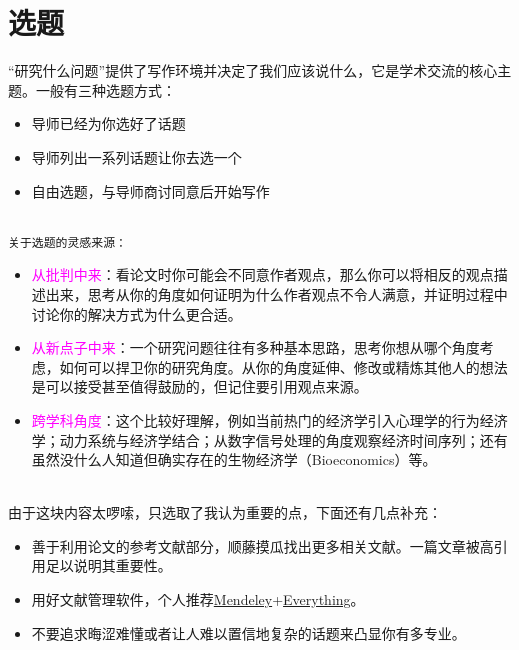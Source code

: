 \documentclass[cn,hazy,blue,14pt,screen]{elegantnote} %
\begin{document}
\newpage

\section{选题}

“研究什么问题”提供了写作环境并决定了我们应该说什么，它是学术交流的核心主题。一般有三种选题方式：

\begin{itemize}
  \item 导师已经为你选好了话题
  \item 导师列出一系列话题让你去选一个
  \item 自由选题，与导师商讨同意后开始写作
\end{itemize}

~\\

\lstinline{关于选题的灵感来源：}

\begin{itemize}
  \item \textcolor{magenta}{从批判中来}：看论文时你可能会不同意作者观点，那么你可以将相反的观点描述出来，思考从你的角度如何证明为什么作者观点不令人满意，并证明过程中讨论你的解决方式为什么更合适。
  \item \textcolor{magenta}{从新点子中来}：一个研究问题往往有多种基本思路，思考你想从哪个角度考虑，如何可以捍卫你的研究角度。从你的角度延伸、修改或精炼其他人的想法是可以接受甚至值得鼓励的，但记住要引用观点来源。
  \item \textcolor{magenta}{跨学科角度}：这个比较好理解，例如当前热门的经济学引入心理学的行为经济学；动力系统与经济学结合；从数字信号处理的角度观察经济时间序列；还有虽然没什么人知道但确实存在的生物经济学（Bioeconomics）等。
\end{itemize}

~\\

由于这块内容太啰嗦，只选取了我认为重要的点，下面还有几点补充：

\begin{itemize}
  \item 善于利用论文的参考文献部分，顺藤摸瓜找出更多相关文献。一篇文章被高引用足以说明其重要性。
  \item 用好文献管理软件，个人推荐\href{https://www.mendeley.com/?interaction_required=true}{Mendeley}+\href{https://www.voidtools.com/zh-cn/}{Everything}。
  \item 不要追求晦涩难懂或者让人难以置信地复杂的话题来凸显你有多专业。
\end{itemize}
\end{document}
